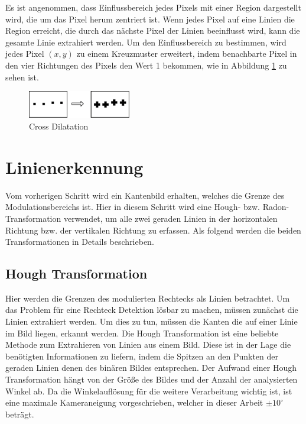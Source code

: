 Es ist angenommen, dass Einflussbereich jedes Pixels mit einer Region dargestellt wird, die um das Pixel herum zentriert ist. Wenn jedes Pixel auf eine Linien die Region erreicht, die durch das nächste Pixel der Linien beeinflusst wird, kann die gesamte Linie extrahiert werden. Um den Einflussbereich zu bestimmen, wird jedes Pixel $ (x,y) $ zu einem Kreuzmuster erweitert, indem benachbarte Pixel in den vier Richtungen des Pixels den Wert 1 bekommen, wie in Abbildung \ref{Cross Dilatation} zu sehen ist.

\begin{figure}[H]
 \centering 
  \includegraphics[keepaspectratio,width=0.4\textwidth]{images/4_ZweiteErfahrung/cd/cd1.pdf}
 \caption{Cross Dilatation}
 \label{Cross Dilatation}
\end{figure}

\section{Linienerkennung}

Vom vorherigen Schritt wird ein Kantenbild erhalten, welches die Grenze des Modulationsbereichs ist. Hier in diesem Schritt wird eine Hough- bzw. Radon-Transformation verwendet, um alle zwei geraden Linien in der horizontalen Richtung bzw. der vertikalen Richtung zu erfassen. Als folgend werden die beiden Transformationen in Details beschrieben.

\subsection{Hough Transformation}

Hier werden die Grenzen des modulierten Rechtecks als Linien betrachtet. Um das Problem für eine Rechteck Detektion lösbar zu machen, müssen zunächst die Linien extrahiert werden. Um dies zu tun, müssen die Kanten die auf einer Linie im Bild liegen, erkannt werden. Die Hough Transformation \cite{hough} ist eine beliebte Methode zum Extrahieren von Linien aus einem Bild. Diese ist in der Lage die benötigten Informationen zu liefern, indem die Spitzen an den Punkten der geraden Linien denen des binären Bildes entsprechen. Der Aufwand einer Hough Transformation hängt von der Größe des Bildes und der Anzahl der analysierten Winkel ab. Da die Winkelauflösung für die weitere Verarbeitung wichtig ist, ist eine maximale Kameraneigung vorgeschrieben, welcher in dieser Arbeit $ \pm 10^{\circ} $ beträgt.

